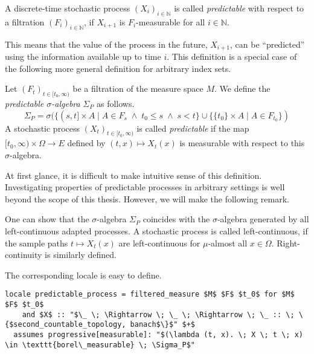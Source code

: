 \begin{definition}
	A discrete-time stochastic process $(X_i)_{i\in\mathbb{N}}$ is called \textit{predictable} with respect to a filtration $(F_i)_{i\in\mathbb{N}}$, if $X_{i + 1}$ is $F_i$-measurable for all $i \in \mathbb{N}$.
\end{definition}

This means that the value of the process in the future, $X_{i+1}$, can be ``predicted'' using the information available up to time $i$. This definition is a special case of the following more general definition for arbitrary index sets.

\begin{definition}
	Let $(F_t)_{t\in[t_0, \infty)}$ be a filtration of the measure space $M$. We define the \textit{predictable $\sigma$-algebra} $\Sigma_P$ as follows.
	\[
		\Sigma_P = \sigma(\{(s,t] \times A \;\vert\; A \in F_s \;\wedge\; t_0 \le s \;\wedge\; s < t \} \cup \{\{t_0\} \times A \;\vert\; A \in F_{t_0}\})
	\]
	A stochastic process $(X_t)_{t\in[t_0, \infty)}$ is called \textit{predictable} if the map $[t_0, \infty) \times \Omega \rightarrow E$ defined by $(t,x) \mapsto X_t(x)$ is measurable with respect to this $\sigma$-algebra.
\end{definition}

At first glance, it is difficult to make intuitive sense of this definition. Investigating properties of predictable processes in arbitrary settings is well beyond the scope of this thesis. However, we will make the following remark.

\begin{remark}
	One can show that the $\sigma$-algebra $\Sigma_P$ coincides with the $\sigma$-algebra generated by all left-continuous adapted processes. A stochastic process is called left-continuous, if the sample paths $t \mapsto X_t(x)$ are left-continuous for $\mu$-almost all $x \in \Omega$. Right-continuity is similarly defined.
\end{remark}

The corresponding locale is easy to define.

\begin{isadefinition}
{\small
\begin{lstlisting}[style=isabelle]
locale predictable_process = filtered_measure $M$ $F$ $t_0$ for $M$ $F$ $t_0$
	and $X$ :: "$\_ \; \Rightarrow \; \_ \; \Rightarrow \; \_ :: \; \{$second_countable_topology, banach$\}$" $+$
  assumes progressive[measurable]: "$(\lambda (t, x). \; X \; t \; x) \in \texttt{borel\_measurable} \; \Sigma_P$"
\end{lstlisting}
}
\end{isadefinition}

